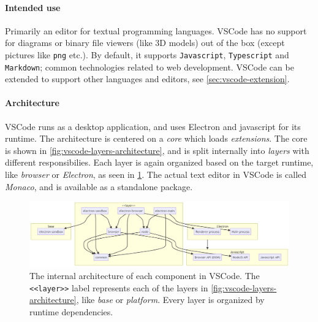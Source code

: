 \paragraph*{Intended use} Primarily an editor for textual programming languages.
VSCode has no support for diagrams or binary file viewers (like 3D models) out of the box (except pictures like \texttt{png} etc.). By default, it supports \texttt{Javascript}, \texttt{Typescript} and \texttt{Markdown}; common technologies related to web development.
VSCode can be extended to support other languages and editors, see \cref{sec:vscode-extension}.


\paragraph*{Architecture}
VSCode runs as a desktop application, and uses Electron and javascript for its runtime.
The architecture is centered on a \emph{core} which loads \emph{extensions}.
The core is shown in \cref{fig:vscode-layers-architecture}, and is split internally into \emph{layers} with different responsibilies.
Each layer is again organized based on the target runtime, like \emph{browser} or \emph{\gls{Electron}}, as seen in \cref{fig:vscode-component-architecture}.
The actual text editor in \gls{VSCode} is called \emph{Monaco}, and is available as a standalone package.~\cite{benjaminpaseroSourceCodeOrganization2020}


\begin{figure}[htbp]
  \centering %
  \includegraphics[width=\textwidth]{figures/vscode-component-architecture}
  \caption[VSCode component Architecture]{The internal architecture of each component in VSCode. The \texttt{<<layer>>} label represents each of the layers in \cref{fig:vscode-layers-architecture}, like \emph{base} or \emph{platform}. Every layer is organized by runtime dependencies.~\cite{benjaminpaseroSourceCodeOrganization2020}}\label{fig:vscode-component-architecture}
\end{figure}

